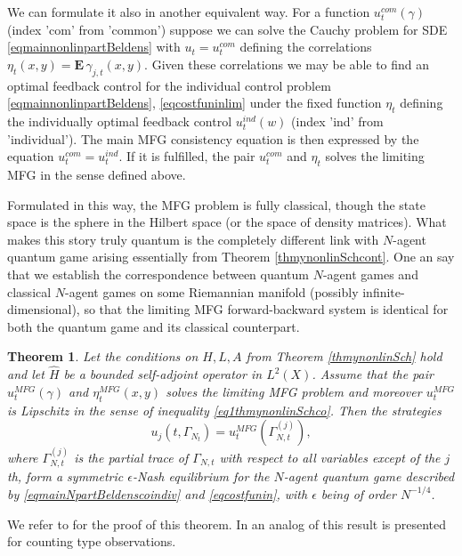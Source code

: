 \documentclass[12pt]{article}
\def\E{\mathbf{E}}
\def\ep{\epsilon}
\def\ga{\gamma}
\newtheorem{theorem}{Theorem}[section]
\newcommand{\Ga}{\Gamma}
\begin{document}
We can formulate it also in another equivalent way. For a function $u_t^{com}(\ga)$
(index 'com' from 'common') suppose we can solve
the Cauchy problem for SDE \eqref{eqmainnonlinpartBeldens} with $u_t=u_t^{com}$ defining the correlations
$\eta_t(x,y)=\E \, \ga_{j,t}(x,y)$. Given these correlations we may be able to find an optimal feedback
control for the individual control problem \eqref{eqmainnonlinpartBeldens},
\eqref{eqcostfuninlim} under the fixed function $\eta_t$
 defining the individually optimal feedback
control $u_t^{ind}(w)$ (index 'ind' from 'individual').
The main MFG consistency equation is then expressed by
the equation  $u_t^{com}=u_t^{ind}$. If it is fulfilled, the pair $u_t^{com}$ and $\eta_t$
solves the limiting MFG in the sense defined above.

Formulated in this way, the MFG problem is fully classical, though the state space is the
sphere in the Hilbert space (or the space of density matrices).
 What makes this story truly quantum is the completely different
link with $N$-agent quantum game arising essentially from Theorem \ref{thmynonlinSchcont}.
 One an say that we establish the correspondence between quantum $N$-agent games and classical
$N$-agent games on some Riemannian manifold (possibly infinite-dimensional), so that the limiting
MFG forward-backward system is identical for both the quantum game and its classical counterpart.


\begin{theorem}
\label{mainresult}
Let the conditions on $H,L,A$ from Theorem \ref{thmynonlinSch} hold and let $\hat H$ be a
bounded self-adjoint operator  in $L^2(X)$.
Assume that the pair  $u^{MFG}_t(\ga)$ and $\eta^{MFG}_t(x,y)$
solves the limiting MFG problem and moreover $u^{MFG}_t$ is Lipschitz in the sense of
inequality \eqref{eq1thmynonlinSchco}.
Then the strategies
\[
u_j(t,\Ga_{N_t})=u^{MFG}_t(\Ga^{(j)}_{N,t}),
\]
where $\Ga^{(j)}_{N,t}$ is the partial trace of $\Ga_{N,t}$ with respect to all variables
except of the $j$th, form a symmetric $\ep$-Nash equilibrium for the $N$-agent quantum game
described by \eqref{eqmainNpartBeldenscoindiv} and \eqref{eqcostfunin},
with $\ep$ being of order $N^{-1/4}$.
\end{theorem}

We refer to \cite{KolQuantMFG} for the proof of this theorem. In \cite{KolQuantMFGCount} an analog of this result is
presented for counting type observations.
\end{document}
